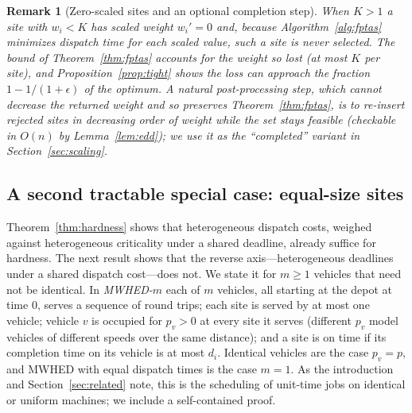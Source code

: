 \documentclass[pdflatex,sn-mathphys-ay]{sn-jnl}
\theoremstyle{thmstyleone}
\theoremstyle{thmstyletwo}
\newtheorem{remark}{Remark}
\theoremstyle{thmstylethree}
\begin{document}
\begin{remark}[Zero-scaled sites and an optional completion step]\label{rem:completion}
When $K>1$ a site with $w_i<K$ has scaled weight $w_i'=0$ and, because
Algorithm~\ref{alg:fptas} minimizes dispatch time for each scaled value,
such a site is never selected. The bound of Theorem~\ref{thm:fptas}
accounts for the weight so lost (at most $K$ per site), and
Proposition~\ref{prop:tight} shows the loss can approach the fraction
$1-1/(1+\epsilon)$ of the optimum. A natural post-processing step, which cannot decrease the
returned weight and so preserves Theorem~\ref{thm:fptas}, is to
re-insert rejected sites in decreasing order of weight while the set
stays feasible (checkable in $O(n)$ by Lemma~\ref{lem:edd}); we use it
as the ``completed'' variant in Section~\ref{sec:scaling}.
\end{remark}

\subsection{A second tractable special case: equal-size sites}\label{sec:equalp}

Theorem~\ref{thm:hardness} shows that heterogeneous dispatch costs,
weighed against heterogeneous criticality under a shared deadline,
already suffice for hardness. The next result shows that the reverse
axis---heterogeneous deadlines under a shared dispatch cost---does not.
We state it for $m\ge1$ vehicles that need not be identical. In
\emph{MWHED-$m$} each of $m$ vehicles, all starting at the depot at time
$0$, serves a sequence of round trips; each site is served by at most one
vehicle; vehicle $v$ is occupied for $p_v>0$ at every site it serves
(different $p_v$ model vehicles of different speeds over the same
distance); and a site is on time if its completion time on its vehicle is
at most $d_i$. Identical vehicles are the case $p_v=p$, and MWHED with
equal dispatch times is the case $m=1$. As the introduction and
Section~\ref{sec:related} note, this is the scheduling of unit-time jobs
on identical or uniform machines; we include a self-contained proof.
\end{document}
